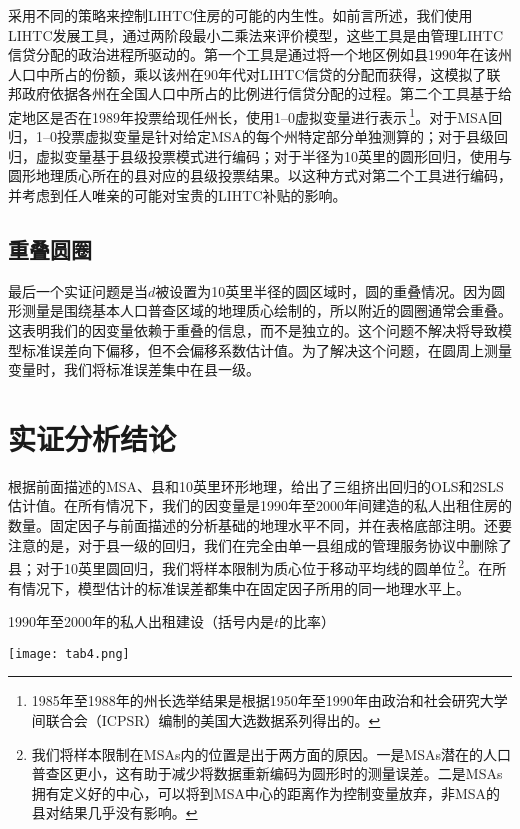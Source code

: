 \documentclass[lang=cn,11pt,a4paper]{paper}
\begin{document}
采用不同的策略来控制LIHTC住房的可能的内生性。如前言所述，我们使用LIHTC发展工具，通过两阶段最小二乘法来评价模型，这些工具是由管理LIHTC信贷分配的政治进程所驱动的。第一个工具是通过将一个地区例如县1990年在该州人口中所占的份额，乘以该州在90年代对LIHTC信贷的分配而获得，这模拟了联邦政府依据各州在全国人口中所占的比例进行信贷分配的过程。第二个工具基于给定地区是否在1989年投票给现任州长，使用1–0虚拟变量进行表示\,\footnote{1985年至1988年的州长选举结果是根据1950年至1990年由政治和社会研究大学间联合会（ICPSR）编制的美国大选数据系列得出的。}。对于MSA回归，1–0投票虚拟变量是针对给定MSA的每个州特定部分单独测算的；对于县级回归，虚拟变量基于县级投票模式进行编码；对于半径为10英里的圆形回归，使用与圆形地理质心所在的县对应的县级投票结果。以这种方式对第二个工具进行编码，并考虑到任人唯亲的可能对宝贵的LIHTC补贴的影响。

\subsection{重叠圆圈}

最后一个实证问题是当$d$被设置为10英里半径的圆区域时，圆的重叠情况。因为圆形测量是围绕基本人口普查区域的地理质心绘制的，所以附近的圆圈通常会重叠。这表明我们的因变量依赖于重叠的信息，而不是独立的。这个问题不解决将导致模型标准误差向下偏移，但不会偏移系数估计值。为了解决这个问题，在圆周上测量变量时，我们将标准误差集中在县一级。

\section{实证分析结论}\label{sec5}

根据前面描述的MSA、县和10英里环形地理，给出了三组挤出回归的OLS和2SLS估计值。在所有情况下，我们的因变量是1990年至2000年间建造的私人出租住房的数量。固定因子与前面描述的分析基础的地理水平不同，并在表格底部注明。还要注意的是，对于县一级的回归，我们在完全由单一县组成的管理服务协议中删除了县；对于10英里圆回归，我们将样本限制为质心位于移动平均线的圆单位\,\footnote{我们将样本限制在MSAs内的位置是出于两方面的原因。一是MSAs潜在的人口普查区更小，这有助于减少将数据重新编码为圆形时的测量误差。二是MSAs拥有定义好的中心，可以将到MSA中心的距离作为控制变量放弃，非MSA的县对结果几乎没有影响。}。在所有情况下，模型估计的标准误差都集中在固定因子所用的同一地理水平上。

\begin{table}[h]
  \caption{1990年至2000年的私人出租建设（括号内是$t$的比率）}\label{tab4}
	\centering
	\texttt{[image: tab4.png]}
\end{table}
  
\end{document}
